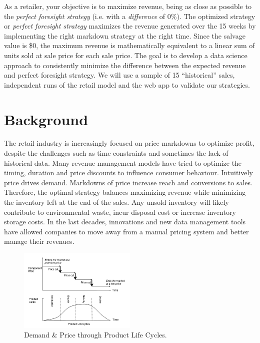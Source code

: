 \documentclass[11pt,a4paper]{article}
\begin{document}
\pagebreak
As a retailer, your objective is to maximize revenue, being as close as possible to the \emph{perfect foresight strategy} (i.e. with a \emph{difference} of 0\%). 
The optimized strategy or \emph{perfect foresight strategy} maximizes the revenue generated over the 15 weeks by implementing the right markdown strategy at the right time. 
Since the salvage value is \$0, the maximum revenue is mathematically equivalent to a linear sum of units sold at sale price for each sale price. 
The goal is to develop a data science approach to consistently minimize the difference between the expected revenue and perfect foresight strategy. 
We will use a sample of 15 “historical” sales, independent runs of the retail model and the web app to validate our strategies.

\section{Background}
The retail industry is increasingly focused on price markdowns to optimize profit, despite the challenges such as time constraints and sometimes the lack of historical data. 
Many revenue management models have tried to optimize the timing, duration and price discounts to influence consumer behaviour. 
Intuitively price drives demand. Markdowns of price increase reach and conversions to sales. 
Therefore, the optimal strategy balances maximizing revenue while minimizing the inventory left at the end of the sales. 
Any unsold inventory will likely contribute to environmental waste, incur disposal cost or increase inventory storage costs. 
In the last decades, innovations and new data management tools have allowed companies to move away from a manual pricing system and better manage their revenues.

\begin{figure}[h]
    \centering
    \includegraphics[width=0.5\textwidth]{pic/f2.png}
    \caption{Demand \& Price through Product Life Cycles. \\\cite{chung2015optimal}}
\end{figure}
\end{document}
